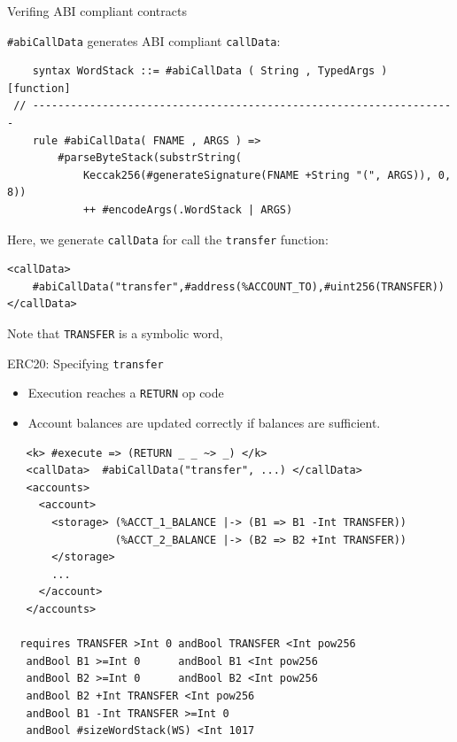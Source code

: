 \documentclass[8pt,ignorenonframetext,]{beamer}
\providecommand{\tightlist}{%
  \setlength{\itemsep}{0pt}\setlength{\parskip}{0pt}}
\begin{document}
\begin{frame}[fragile]{Verifing ABI compliant contracts}

\pause

\texttt{\#abiCallData} generates ABI compliant \texttt{callData}:

\begin{verbatim}
    syntax WordStack ::= #abiCallData ( String , TypedArgs ) [function]
 // -------------------------------------------------------------------
    rule #abiCallData( FNAME , ARGS ) =>
        #parseByteStack(substrString(
            Keccak256(#generateSignature(FNAME +String "(", ARGS)), 0, 8))
            ++ #encodeArgs(.WordStack | ARGS)
\end{verbatim}

\pause

Here, we generate \texttt{callData} for call the \texttt{transfer}
function:

\begin{verbatim}
<callData>
    #abiCallData("transfer",#address(%ACCOUNT_TO),#uint256(TRANSFER))
</callData>
\end{verbatim}

Note that \texttt{TRANSFER} is a symbolic word,

\end{frame}

\begin{frame}[fragile]{ERC20: Specifying \texttt{transfer}}

\pause

\begin{itemize}
\tightlist
\item
  Execution reaches a \texttt{RETURN} op code
\item
  Account balances are updated correctly if balances are sufficient.
\end{itemize}

\begin{verbatim}
   <k> #execute => (RETURN _ _ ~> _) </k>
   <callData>  #abiCallData("transfer", ...) </callData>
   <accounts>
     <account>
       <storage> (%ACCT_1_BALANCE |-> (B1 => B1 -Int TRANSFER))
                 (%ACCT_2_BALANCE |-> (B2 => B2 +Int TRANSFER))
       </storage>
       ...
     </account>
   </accounts>

  requires TRANSFER >Int 0 andBool TRANSFER <Int pow256
   andBool B1 >=Int 0      andBool B1 <Int pow256
   andBool B2 >=Int 0      andBool B2 <Int pow256
   andBool B2 +Int TRANSFER <Int pow256
   andBool B1 -Int TRANSFER >=Int 0
   andBool #sizeWordStack(WS) <Int 1017
\end{verbatim}

\end{frame}
\end{document}
